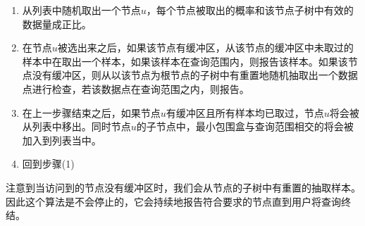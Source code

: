 \begin{enumerate}
\item 从列表中随机取出一个节点$ u $，每个节点被取出的概率和该节点子树中有效的数据量成正比。

\item 在节点$ u $被选出来之后，如果该节点有缓冲区，从该节点的缓冲区中未取过的样本中在取出一个样本，如果该样本在查询范围内，则报告该样本。如果该节点没有缓冲区，则从以该节点为根节点的子树中有重置地随机抽取出一个数据点进行检查，若该数据点在查询范围之内，则报告。

\item 在上一步骤结束之后，如果节点$ u $有缓冲区且所有样本均已取过，节点$ u $将会被从列表中移出。同时节点$ u $的子节点中，最小包围盒与查询范围相交的将会被加入到列表当中。

\item 回到步骤(1)
\end{enumerate}



注意到当访问到的节点没有缓冲区时，我们会从节点的子树中有重置的抽取样本。因此这个算法是不会停止的，它会持续地报告符合要求的节点直到用户将查询终结。















